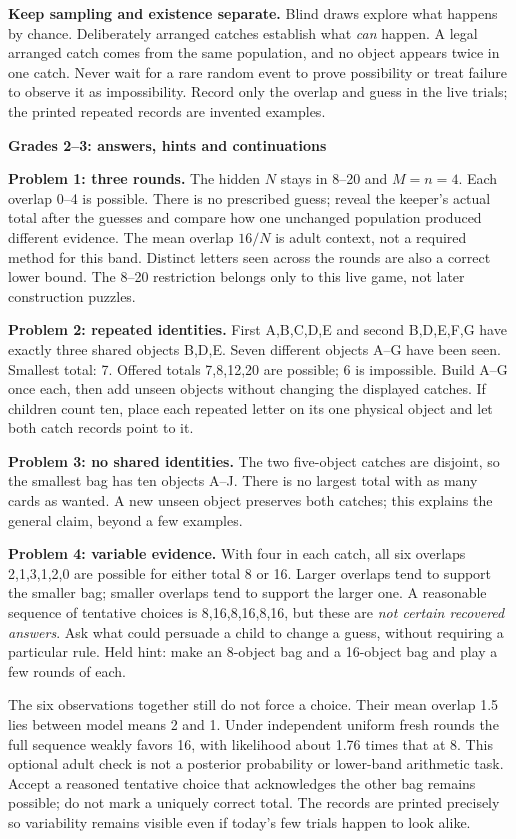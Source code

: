 \documentclass[letterpaper,11pt]{article}
\newcommand{\topic}[1]{\par\medskip\textbf{#1}\par}
\begin{document}
\textbf{Keep sampling and existence separate.} Blind draws explore what happens by chance. Deliberately arranged catches establish what \emph{can} happen. A legal arranged catch comes from the same population, and no object appears twice in one catch. Never wait for a rare random event to prove possibility or treat failure to observe it as impossibility. Record only the overlap and guess in the live trials; the printed repeated records are invented examples.
\newpage
\topic{Grades 2--3: answers, hints and continuations}
\textbf{Problem 1: three rounds.} The hidden $N$ stays in 8--20 and $M=n=4$. Each overlap 0--4 is possible. There is no prescribed guess; reveal the keeper's actual total after the guesses and compare how one unchanged population produced different evidence. The mean overlap $16/N$ is adult context, not a required method for this band. Distinct letters seen across the rounds are also a correct lower bound. The 8--20 restriction belongs only to this live game, not later construction puzzles.

\textbf{Problem 2: repeated identities.} First A,B,C,D,E and second B,D,E,F,G have exactly three shared objects B,D,E. Seven different objects A--G have been seen. Smallest total: 7. Offered totals 7,8,12,20 are possible; 6 is impossible. Build A--G once each, then add unseen objects without changing the displayed catches. If children count ten, place each repeated letter on its one physical object and let both catch records point to it.

\textbf{Problem 3: no shared identities.} The two five-object catches are disjoint, so the smallest bag has ten objects A--J. There is no largest total with as many cards as wanted. A new unseen object preserves both catches; this explains the general claim, beyond a few examples.

\textbf{Problem 4: variable evidence.} With four in each catch, all six overlaps 2,1,3,1,2,0 are possible for either total 8 or 16. Larger overlaps tend to support the smaller bag; smaller overlaps tend to support the larger one. A reasonable sequence of tentative choices is 8,16,8,16,8,16, but these are \emph{not certain recovered answers}. Ask what could persuade a child to change a guess, without requiring a particular rule. Held hint: make an 8-object bag and a 16-object bag and play a few rounds of each.

The six observations together still do not force a choice. Their mean overlap 1.5 lies between model means 2 and 1. Under independent uniform fresh rounds the full sequence weakly favors 16, with likelihood about 1.76 times that at 8. This optional adult check is not a posterior probability or lower-band arithmetic task. Accept a reasoned tentative choice that acknowledges the other bag remains possible; do not mark a uniquely correct total. The records are printed precisely so variability remains visible even if today's few trials happen to look alike.
\end{document}
